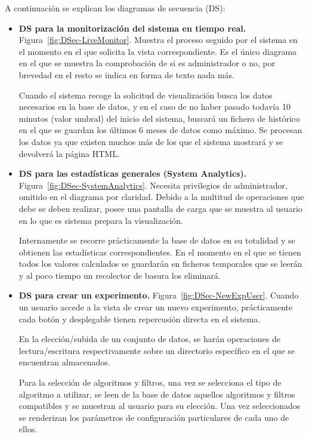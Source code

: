A continuación se explican los diagramas de secuencia (DS):
\begin{itemize}
\item \textbf{DS para la monitorización del sistema en tiempo real.} Figura~\ref{fig:DSec-LiveMonitor}. Muestra el proceso seguido por el sistema en el momento en el que solicita la vista correspondiente. Es el único diagrama en el que se muestra la comprobación de si es administrador o no, por brevedad en el resto se indica en forma de texto nada más. 

Cuando el sistema recoge la solicitud de visualización busca los datos necesarios en la base de datos, y en el caso de no haber pasado todavía 10 minutos (valor umbral) del inicio del sistema, buscará un fichero de histórico en el que se guardan los últimos 6 meses de datos como máximo. Se procesan los datos ya que existen muchos más de los que el sistema mostrará y se devolverá la página HTML.

\item \textbf{DS para las estadísticas generales (System Analytics).} Figura~\ref{fig:DSec-SystemAnalytics}. Necesita privilegios de administrador, omitido en el diagrama por claridad. Debido a la multitud de operaciones que debe se deben realizar, posee una pantalla de carga que se muestra al usuario en lo que es sistema prepara la visualización. 

Internamente se recorre prácticamente la base de datos en su totalidad y se obtienen las estadísticas correspondientes. En el momento en el que se tienen todos los valores calculados se guardarán en ficheros temporales que se leerán y al poco tiempo un recolector de basura los eliminará.

\item \textbf{DS para crear un experimento.} Figura~\ref{fig:DSec-NewExpUser}. Cuando un usuario accede a la vista de crear un nuevo experimento, prácticamente cada botón y desplegable tienen repercusión directa en el sistema. 

En la elección/subida de un conjunto de datos, se harán operaciones de lectura/escritura respectivamente sobre un directorio específico en el que se encuentran almacenados. 

Para la selección de algoritmos y filtros, una vez se selecciona el tipo de algoritmo a utilizar, se leen de la base de datos aquellos algoritmos y filtros compatibles y se muestran al usuario para su elección. Una vez seleccionados se renderizan los parámetros de configuración particulares de cada uno de ellos.


\end{itemize}
